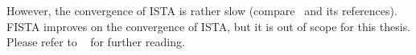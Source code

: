 However, the convergence of \gls{ISTA} is rather slow (compare~\cite{beck_fast_2009} and its
references). \gls{FISTA} improves on the convergence of \gls{ISTA}, but it is out of scope for this
thesis. Please refer to \citeauthor{beck_fast_2009}~\cite{beck_fast_2009} for further reading.

%
%

